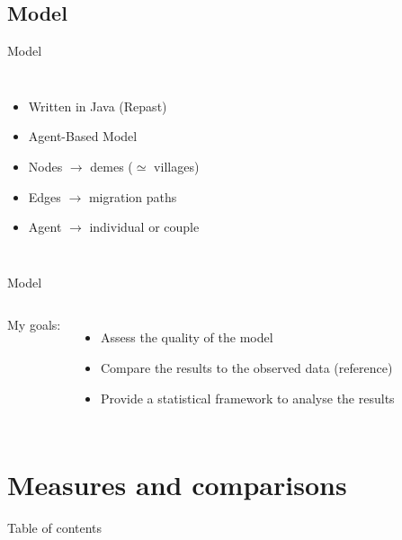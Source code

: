 \documentclass[10pt, aspectratio=43]{beamer}
\begin{document}
\subsection{Model}
\begin{frame}{}{Model}
\vspace*{-0.8cm}
\begin{columns}

  \begin{itemize}
    \item Written in Java (Repast)
    \item Agent-Based Model
    \item Nodes $\rightarrow$ demes ($\simeq$ villages)
    \item Edges $\rightarrow$ migration paths
    \item Agent $\rightarrow$ individual or couple
  \end{itemize}

\end{columns}
\end{frame}

\begin{frame}{}{Model}
\vspace*{-0.8cm}
\begin{columns}

  My goals:
  \begin{itemize}
    \item Assess the quality of the model
    \item Compare the results to the observed data (reference)
    \item Provide a statistical framework to analyse the results
  \end{itemize}

\end{columns}
\end{frame}


\section{Measures and comparisons}
\begin{frame}{}{Table of contents}
\tableofcontents[currentsection, subsectionstyle=show/show/hide]
\end{frame}
\end{document}
